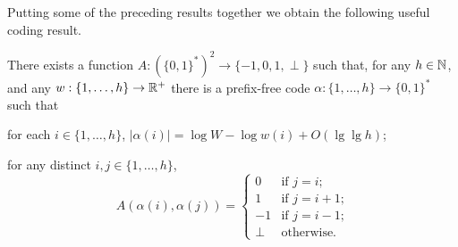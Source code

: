 \documentclass[kpfonts]{patmorin}
\begin{document}
Putting some of the preceding results together we obtain the following useful coding result.

\begin{lem}
  There exists a function $A:(\{0,1\}^*)^2\to\{-1,0,1,\perp\}$ such that, for any $h\in\mathbb{N}$, and any $w:\{1,\ldots,h\}\to\mathbb{R}^+$ there is a prefix-free code $\alpha:\{1,\ldots,h\}\to \{0,1\}^*$ such that 
  \begin{compactenum}
    \item for each $i\in\{1,\ldots,h\}$, $|\alpha(i)|=\log W -\log w(i) + O(\lg\lg h)$;
    \item for any distinct $i,j\in\{1,\ldots,h\}$, 
    \[   A(\alpha(i),\alpha(j)) 
    = \begin{cases}
       0 & \text{if $j=i$;}\\
       1 & \text{if $j=i+1$;} \\
       -1 & \text{if $j=i-1$;} \\
       \perp & \text{otherwise.}
      \end{cases}
      \]
    \end{compactenum}
\end{lem}
\end{document}
